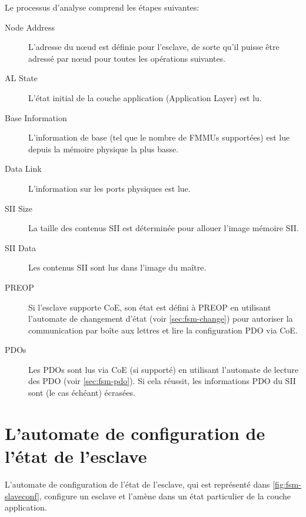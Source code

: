 \documentclass[a4paper,12pt,BCOR6mm,bibtotoc,idxtotoc]{scrbook}
\begin{document}
Le processus d'analyse comprend les \'etapes suivantes:

\begin{description}

\item[Node Address] L'adresse du n\oe{}ud est d\'efinie pour l'esclave,
  de sorte qu'il puisse \^etre adress\'e par n\oe{}ud pour toutes les
  op\'erations suivantes.

\item[AL State] L'\'etat initial de la couche application
  (Application Layer) est lu.

\item[Base Information] L'information de base (tel que le nombre de
  FMMUs support\'ees) est lue depuis la m\'emoire physique la plus basse.

\item[Data Link] L'information sur les ports physiques est lue.

\item[SII Size] La taille des contenus SII est d\'etermin\'ee pour allouer
  l'image m\'emoire SII.

\item[SII Data] Les contenus SII sont lus dans l'image du ma\^itre.

\item[PREOP] Si l'esclave supporte CoE, son \'etat est d\'efini \`a PREOP en
  utilisant l'automate de changement d'\'etat (voir
  \autoref{sec:fsm-change}) pour autoriser la communication par bo\^ite
  aux lettres et lire la configuration PDO via CoE.

\item[PDOs] Les PDOs sont lus via CoE (si support\'e) en utilisant
  l'automate de lecture des PDO (voir \autoref{sec:fsm-pdo}). Si cela
  r\'eussit, les informations PDO du SII sont (le cas \'ech\'eant) \'ecras\'ees.

\end{description}


\section{L'automate de configuration de l'\'etat de l'esclave}
\label{sec:fsm-conf}

L'automate de configuration de l'\'etat de l'esclave, qui est
repr\'esent\'e dans \autoref{fig:fsm-slaveconf}, configure un esclave
et l'am\`ene dans un \'etat particulier de la couche application.
\end{document}
